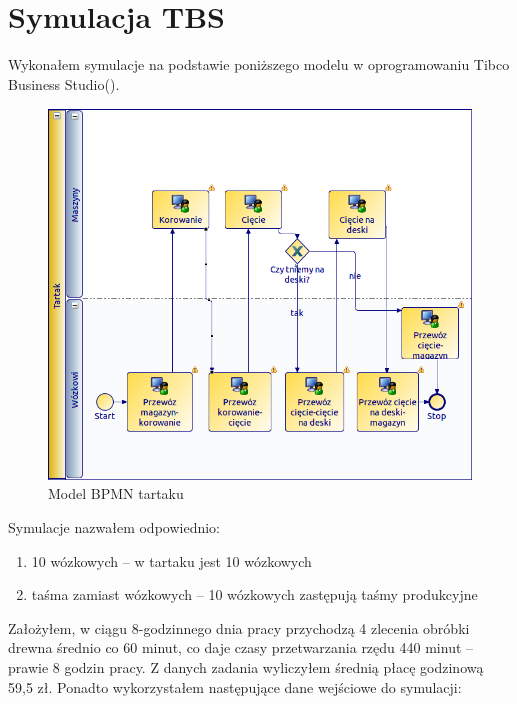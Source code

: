 \documentclass[a4paper]{article}
\begin{document}
\section{Symulacja TBS}
Wykonałem symulacje na podstawie poniższego modelu w oprogramowaniu Tibco Business Studio(\cite{tibco:000}).
\begin{figure}[H]
\centering
\includegraphics[scale=0.5]{img/diagram.png}
\caption{Model BPMN tartaku}
\label{img:diag}
\end{figure}
Symulacje nazwałem odpowiednio:
\begin{enumerate}
\item 10 wózkowych -- w tartaku jest 10 wózkowych
\item taśma zamiast wózkowych -- 10 wózkowych zastępują taśmy produkcyjne
\end{enumerate}
Założyłem, w ciągu 8-godzinnego dnia pracy przychodzą 4 zlecenia obróbki drewna średnio co 60 minut, co daje czasy przetwarzania rzędu 440 minut -- prawie 8 godzin pracy. Z danych zadania wyliczyłem średnią płacę godzinową 59,5 zł. Ponadto wykorzystałem następujące dane wejściowe do symulacji:
\end{document}
